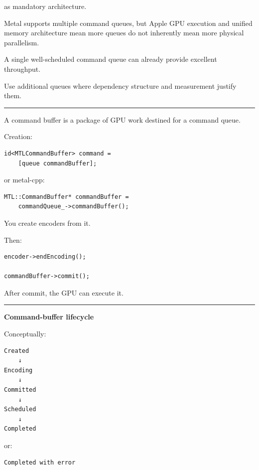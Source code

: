 as mandatory architecture.

Metal supports multiple command queues, but Apple GPU execution and unified memory architecture mean more queues do not inherently mean more physical parallelism.

A single well-scheduled command queue can already provide excellent throughput.

Use additional queues where dependency structure and measurement justify them.

\begin{center}\rule{0.5\linewidth}{0.5pt}\end{center}

\textbf{}

A command buffer is a package of GPU work destined for a command queue.

Creation:

\begin{verbatim}
id<MTLCommandBuffer> command =
    [queue commandBuffer];
\end{verbatim}

or metal-cpp:

\begin{verbatim}
MTL::CommandBuffer* commandBuffer =
    commandQueue_->commandBuffer();
\end{verbatim}

You create encoders from it.

Then:

\begin{verbatim}
encoder->endEncoding();

commandBuffer->commit();
\end{verbatim}

After commit, the GPU can execute it.

\begin{center}\rule{0.5\linewidth}{0.5pt}\end{center}

\textbf{Command-buffer lifecycle}

Conceptually:

\begin{verbatim}
Created
    ↓
Encoding
    ↓
Committed
    ↓
Scheduled
    ↓
Completed
\end{verbatim}

or:

\begin{verbatim}
Completed with error
\end{verbatim}

